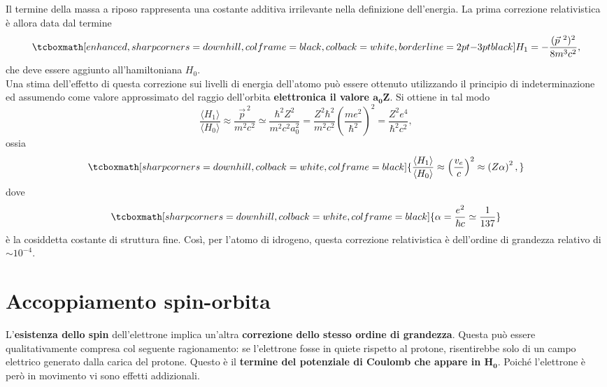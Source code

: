 \documentclass[a4paper,12pt,oneside]{book}
\begin{document}
Il termine della massa a riposo rappresenta una costante additiva irrilevante nella definizione dell'energia. La prima correzione relativistica è allora data dal termine 
	\begin{equation}
	\label{eq:cap25_2}
		\tcboxmath[enhanced, sharp corners=downhill, colframe=black, colback=white, borderline={2pt}{-3pt}{black}]{
			H_1=-\frac{(\vec{p}^{\ 2})^2}{8m^3c^2} ,
			}
	\end{equation}
che deve essere aggiunto all'hamiltoniana $H_0$. \\

Una stima dell'effetto di questa correzione sui livelli di energia dell'atomo può essere ottenuto utilizzando il principio di indeterminazione ed assumendo come valore approssimato del raggio dell'orbita \textbf{elettronica il valore $\boldsymbol{a_0 Z}$}. Si ottiene in tal modo
	\begin{equation} 
		\frac{\langle H_1 \rangle}{\langle H_0 \rangle} \approx \frac{\vec{p}^{\ 2}}{m^2c^2} \simeq \frac{\hbar^2 Z^2}{m^2c^2a_0^2}=\frac{Z^2 \hbar^2}{m^2c^2} \left( \frac{me^2}{\hbar^2}\right)^2=\frac{Z^2 e^4}{\hbar^2 c^2} ,
	\end{equation}
ossia
	\begin{equation}
		\tcboxmath[sharp corners=downhill, colback=white, colframe=black]{
			\frac{\langle H_1 \rangle}{\langle H_0 \rangle} \approx \left( \frac{v_e}{c} \right)^2 \approx \left(  Z \alpha \right)^2 ,
			}
	\end{equation}
dove
	\begin{equation} 
		\tcboxmath[sharp corners=downhill, colback=white, colframe=black]{
		\alpha=\frac{e^2}{\hbar c} \simeq \frac{1}{137}
		}
	\end{equation}
è la cosiddetta costante di struttura fine. Così, per l'atomo di idrogeno, questa correzione relativistica è dell'ordine di grandezza relativo di $\sim10^{-4}$.
\section{Accoppiamento spin-orbita}

L'\textbf{esistenza dello spin} dell'elettrone implica un'altra \textbf{correzione dello stesso ordine di grandezza}. Questa può essere qualitativamente compresa col seguente ragionamento: se l'elettrone fosse in quiete rispetto al protone, risentirebbe solo di un campo elettrico generato dalla carica del protone. Questo è il \textbf{termine del potenziale di Coulomb che appare in $\boldsymbol{H_0}$}. Poiché l'elettrone è però in movimento vi sono effetti addizionali. \\
\end{document}
